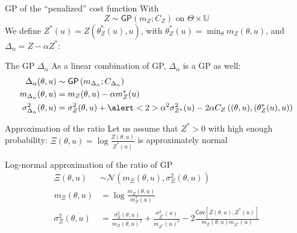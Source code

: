 \documentclass[10pt,aspectratio=169,usepdftitle=false]{beamer}
\newcommand{\Uspace}{\mathbb{U}}
\newcommand{\Kspace}{\Theta}
\newcommand{\GP}{\mathsf{GP}}
\newcommand{\Cov}{\textsf{Cov}}
\newcommand{\kk}{\theta}
\newcommand{\uu}{u}
\begin{document}
\begin{frame}{GP of the ``penalized'' cost function}
  With
  \begin{equation}
    Z \sim \GP\left(m_Z; C_Z\right) \text{ on } \Kspace \times \Uspace
  \end{equation}
  We define $Z^*(\uu)=Z(\kk^*_Z(\uu), \uu)$, with $\kk^*_Z(\uu) = \min_{\kk} m_Z(\kk, \uu)$,
  and $\Delta_{\alpha} = Z - \alpha Z^*$:
  \begin{block}{The GP $\Delta_\alpha$}
    As a linear combination of GP, $\Delta_{\alpha}$ is a GP as well:
  \begin{align}
    \Delta_{\alpha}(\kk, \uu) &\sim \GP\left(m_{\Delta_{\alpha}};C_{\Delta_\alpha}\right) \\
    m_{\Delta_\alpha}(\kk,\uu)   &= m_Z(\kk, \uu) - \alpha m_Z^*(\uu) \\
    \sigma^2_{\Delta_\alpha}(\kk, \uu) &= \sigma^2_{Z}(\kk, \uu) +  \alert<2>{\alpha^2\sigma^2_{Z^*}(\uu)}- 2\alpha C_Z\left((\kk, \uu), ({\kk}_Z^ *(\uu), \uu)\right)
  \end{align}
\end{block}
\end{frame}


\begin{frame}{Approximation of the ratio}
  Let us assume that $Z^*>0$ with high enough probability:
  $\Xi(\kk, \uu) = \log \frac{Z(\kk,\uu)}{Z^*(\uu)}$ is approximately normal
  \begin{block}{Log-normal approximation of the ratio of GP}
    \begin{align}
      \Xi(\kk, \uu) &\sim \mathcal{N}\left(m_\Xi(\kk,\uu), \sigma^2_\Xi(\kk, \uu) \right) \\
      m_\Xi(\kk, \uu) &= \log \frac{m_Z(\kk, \uu)}{m_Z^*(\uu)} \\
      \sigma^2_\Xi(\kk, \uu) &= \frac{\sigma^2_{Z}(\kk, \uu)}{m_{Z}(\kk,\uu)^2} + \frac{\sigma^2_{Z^*}(\uu)}{m_{Z^*}(\uu)^2} - 2 \frac{\Cov[Z(\kk, \uu), Z^*(\uu)]}{m_Z(\kk, \uu)m_{Z^*}(\uu)} 
    \end{align}
  \end{block}
\end{frame}
\end{document}
